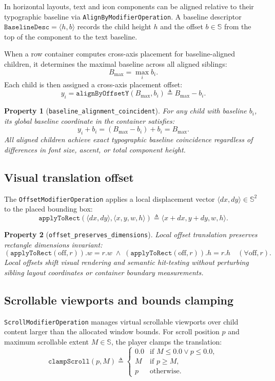 \documentclass[11pt,a4paper]{article}
\newcommand{\Sc}{\mathbb{S}}
\newcommand{\lo}[1]{\texttt{#1}}       %
\newcommand{\jv}[1]{\texttt{#1}}       %
\theoremstyle{definition}
\theoremstyle{plain}
\newtheorem{property}{Property}[section]
\theoremstyle{remark}
\begin{document}
In horizontal layouts, text and icon components can be aligned relative to their
typographic baseline via \jv{AlignByModifierOperation}. A baseline descriptor
$\lo{BaselineDesc} = \langle h, b \rangle$ records the child height $h$ and the
offset $b \in \Sc$ from the top of the component to the text baseline.

When a row container computes cross-axis placement for baseline-aligned children,
it determines the maximal baseline across all aligned siblings:
\[
  B_{\max} = \max_{i} b_i.
\]
Each child is then assigned a cross-axis placement offset:
\[
  y_i = \lo{alignByOffsetY}(B_{\max}, b_i) \triangleq B_{\max} - b_i.
\]

\begin{property}[\lo{baseline\_alignment\_coincident}]
For any child with baseline $b_i$, its global baseline coordinate in the container satisfies:
\[
  y_i + b_i = (B_{\max} - b_i) + b_i = B_{\max}.
\]
All aligned children achieve exact typographic baseline coincidence regardless of differences
in font size, ascent, or total component height.
\end{property}

\subsection{Visual translation offset}
\label{sec:mod-offset}

The \jv{OffsetModifierOperation} applies a local displacement vector
$\langle dx, dy \rangle \in \Sc^2$ to the placed bounding box:
\[
  \lo{applyToRect}(\langle dx, dy \rangle, \langle x, y, w, h \rangle) \triangleq
  \langle x + dx, y + dy, w, h \rangle.
\]

\begin{property}[\lo{offset\_preserves\_dimensions}]
Local offset translation preserves rectangle dimensions invariant:
\[
  (\lo{applyToRect}(\mathrm{off}, r)).w = r.w \;\land\;
  (\lo{applyToRect}(\mathrm{off}, r)).h = r.h \quad (\forall \mathrm{off}, r).
\]
Local offsets shift visual rendering and semantic hit-testing without perturbing
sibling layout coordinates or container boundary measurements.
\end{property}

\subsection{Scrollable viewports and bounds clamping}
\label{sec:mod-scroll}

\jv{ScrollModifierOperation} manages virtual scrollable viewports over child content
larger than the allocated window bounds. For scroll position $p$ and maximum scrollable
extent $M \in \Sc$, the player clamps the translation:
\[
  \lo{clampScroll}(p, M) \triangleq \begin{cases}
    0.0 & \text{if } M \le 0.0 \lor p \le 0.0, \\
    M   & \text{if } p \ge M, \\
    p   & \text{otherwise.}
  \end{cases}
\]
\end{document}
